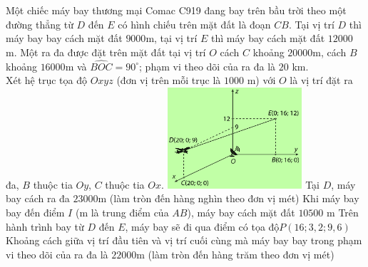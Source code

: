 \begin{ex}%
    \immini
    {
        Một chiếc máy bay thương mại Comac C919 đang bay trên bầu trời theo một đường thẳng từ $D$ đến $E$ có hình chiếu trên mặt đất là đoạn $CB$. Tại vị trí $D$ thì máy bay bay cách mặt đất $9000$m, tại vị trí $E$ thì máy bay cách mặt đất $12000$ m. Một ra đa được đặt trên mặt đất tại vị trí $O$ cách $C$ khoảng $20000$m, cách $B$ khoảng $16000$m và $\widehat{BOC}=90^\circ$; phạm vi theo dõi của ra đa là $20$ km.\\
        Xét hệ trục tọa độ $ Oxyz$ (đơn vị trên mỗi trục là $ 1000$ m) với $ O$ là vị trí đặt ra đa, $ B$ thuộc tia $Oy$, $C$ thuộc tia $ Ox$.
    }
    {
        \includegraphics[width=5cm]{img/HXN-9-15}
    }
    \choiceTF
    {Tại $ D$, máy bay cách ra đa $23000$m (làm tròn đến hàng nghìn theo đơn vị mét)}
    {\True Khi máy bay bay đến điểm $ I$ (m là trung điểm của $AB$), máy bay cách mặt đất $10500$ m}
    {\True Trên hành trình bay từ $ D$ đến $E$, máy bay sẽ đi qua điểm có tọa độ$ P(16;3,2;9,6)$}
    {Khoảng cách giữa vị trí đầu tiên và vị trí cuối cùng mà máy bay bay trong phạm vi theo dõi của ra đa là $22000$m (làm tròn đến hàng trăm theo đơn vị mét)}
\end{ex}
